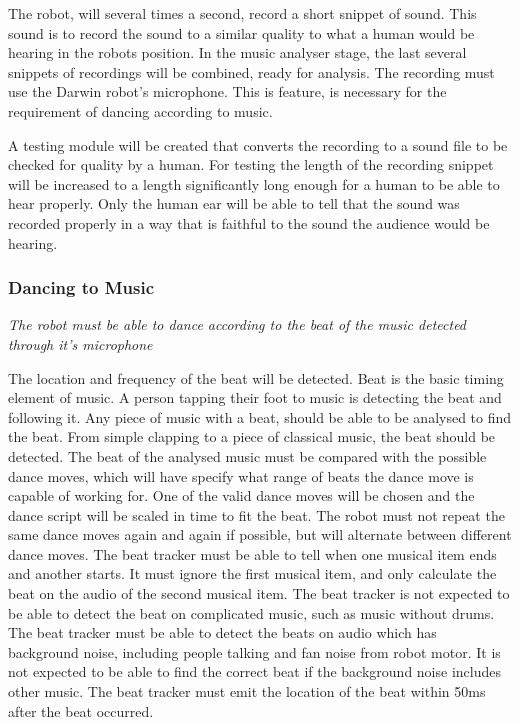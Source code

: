 \documentclass[english,12pt]{scrartcl}
\newcommand{\requirement}[1]{\textit{#1}}
\begin{document}
				The robot, will several times a second, record a short snippet of sound. This sound is to record the
sound to a similar quality to what a human would be hearing in the robots position. In the music
analyser stage, the last several snippets of recordings will be combined, ready for analysis. The
recording must use the Darwin robot’s microphone.
				This is feature, is necessary for the requirement of dancing according to music.

				A testing module will be created that converts the recording to a sound file to be checked for
quality by a human. For testing the length of the recording snippet will be increased to a length
significantly long enough for a human to be able to hear properly. Only the human ear will be
able to tell that the sound was recorded properly in a way that is faithful to the sound the
audience would be hearing.
			\subsubsection{Dancing to Music}
				\requirement{The robot must be able to dance according to the beat of the music detected through it's microphone}

				The location and frequency of the beat will be detected. Beat is the basic timing element of
music. A person tapping their foot to music is detecting the beat and following it. Any piece of
music with a beat, should be able to be analysed to find the beat. From simple clapping to a piece
of classical music, the beat should be detected.
				The beat of the analysed music must be compared with the possible dance moves, which will
have specify what range of beats the dance move is capable of working for. One of the valid dance
moves will be chosen and the dance script will be scaled in time to fit the beat.
				The robot must not repeat the same dance moves again and again if possible, but will alternate between different dance moves.
				The beat tracker must be able to tell when one musical item ends and another starts. It must
ignore the first musical item, and only calculate the beat on the audio of the second musical item.
				The beat tracker is not expected to be able to detect the beat on complicated music, such as music without  drums.
				The beat tracker must be able to detect the beats on audio which has background noise, including people talking and fan noise from robot motor. It is not expected to be able to find the correct beat if the background noise includes other music.
				The beat tracker must emit the location of the beat within 50ms after the beat occurred.
\end{document}

